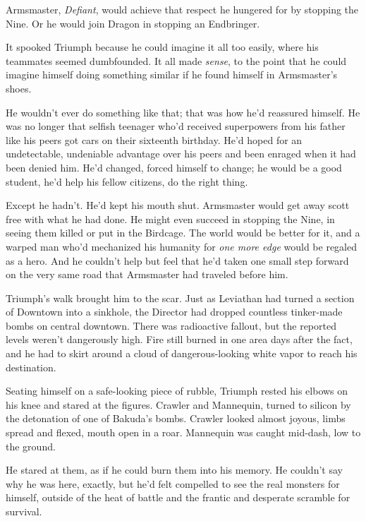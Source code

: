 Armsmaster, \emph{Defiant}, would achieve that respect he hungered for by stopping the Nine.  Or he would join Dragon in stopping an Endbringer.



It spooked Triumph because he could imagine it all too easily, where his teammates seemed dumbfounded.  It all made \emph{sense}, to the point that he could imagine himself doing something similar if he found himself in Armsmaster's shoes.



He wouldn't ever do something like that; that was how he'd reassured himself.  He was no longer that selfish teenager who'd received superpowers from his father like his peers got cars on their sixteenth birthday.  He'd hoped for an undetectable, undeniable advantage over his peers and been enraged when it had been denied him.  He'd changed, forced himself to change; he would be a good student, he'd help his fellow citizens, do the right thing.



Except he hadn't.  He'd kept his mouth shut.  Armsmaster would get away scott free with what he had done.  He might even succeed in stopping the Nine, in seeing them killed or put in the Birdcage.  The world would be better for it, and a warped man who'd mechanized his humanity for \emph{one more edge} would be regaled as a hero.  And he couldn't help but feel that he'd taken one small step forward on the very same road that Armsmaster had traveled before him.



Triumph's walk brought him to the scar.  Just as Leviathan had turned a section of Downtown into a sinkhole, the Director had dropped countless tinker-made bombs on central downtown.  There was radioactive fallout, but the reported levels weren't dangerously high.  Fire still burned in one area days after the fact, and he had to skirt around a cloud of dangerous-looking white vapor to reach his destination.



Seating himself on a safe-looking piece of rubble, Triumph rested his elbows on his knee and stared at the figures.  Crawler and Mannequin, turned to silicon by the detonation of one of Bakuda's bombs.  Crawler looked almost joyous, limbs spread and flexed, mouth open in a roar.  Mannequin was caught mid-dash, low to the ground.



He stared at them, as if he could burn them into his memory.  He couldn't say why he was here, exactly, but he'd felt compelled to see the real monsters for himself, outside of the heat of battle and the frantic and desperate scramble for survival.



